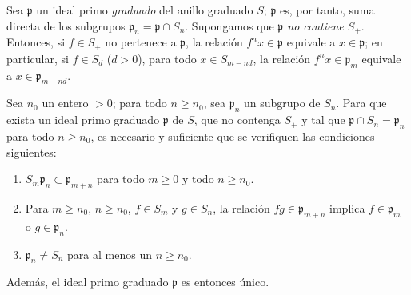 \documentclass[oneside,10pt]{amsart}
\renewcommand{\geq}{\geqslant}
\let\EGAOriginalLabel\label
\renewcommand{\label}[1]{\phantomsection\EGAOriginalLabel{#1}}
\begin{document}
\begin{env}[2.1.8]
\label{II.2.1.8}
Sea $\mathfrak{p}$ un ideal primo \emph{graduado} del anillo graduado $S$; $\mathfrak{p}$ es, por tanto, suma directa de los subgrupos $\mathfrak{p}_n=\mathfrak{p}\cap S_n$.
Supongamos que \emph{$\mathfrak{p}$ no contiene $S_+$}.
Entonces, si $f\in S_+$ no pertenece a $\mathfrak{p}$, la relación $f^nx\in\mathfrak{p}$ equivale a $x\in\mathfrak{p}$; en particular, si $f\in S_d$ ($d>0$), para todo $x\in S_{m-nd}$, la relación $f^nx\in\mathfrak{p}_m$ equivale a $x\in\mathfrak{p}_{m-nd}$.
\end{env}

\begin{proposition}[2.1.9]
\label{II.2.1.9}
Sea $n_0$ un entero $>0$; para todo $n\geq n_0$, sea $\mathfrak{p}_n$ un subgrupo de $S_n$.
Para que exista un ideal primo graduado $\mathfrak{p}$ de $S$, que no contenga $S_+$ y tal que $\mathfrak{p}\cap S_n=\mathfrak{p}_n$ para todo $n\geq n_0$, es necesario y suficiente que se verifiquen las condiciones siguientes:
\begin{enumerate}
  \item[{\rm($1^\circ$)}] $S_m\mathfrak{p}_n\subset\mathfrak{p}_{m+n}$ para todo $m\geq0$ y todo $n\geq n_0$.
  \item[{\rm($2^\circ$)}] Para $m\geq n_0$, $n\geq n_0$, $f\in S_m$ y $g\in S_n$, la relación $fg\in\mathfrak{p}_{m+n}$ implica $f\in\mathfrak{p}_m$ o $g\in\mathfrak{p}_n$.
  \item[{\rm($3^\circ$)}] $\mathfrak{p}_n\neq S_n$ para al menos un $n\geq n_0$.
\end{enumerate}
Además, el ideal primo graduado $\mathfrak{p}$ es entonces único.
\end{proposition}
\end{document}
